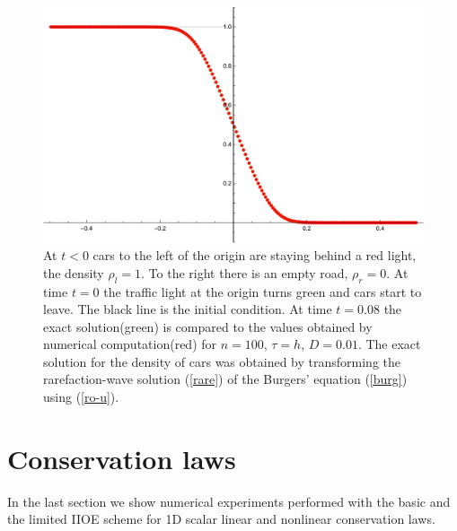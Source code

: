 \documentclass[../include.tex]{subfiles}
\begin{document}
\begin{figure}[h!]
	\centering
	\includegraphics[width=.5\textwidth]{figures/trafficRare1}
	\caption{At $ t<0 $ cars to the left of the origin are staying behind a red light, the density $ \rho_l = 1 $. To the right there is an empty road, $ \rho_r = 0 $. At time $ t = 0 $ the traffic light at the origin turns green and cars start to leave. The black line is the initial condition. At time $ t = 0.08 $ the exact solution(green) is compared to the values obtained by numerical computation(red) for $ n = 100 $, $ \tau = h $, $ D = 0.01 $. The exact solution for the density of cars was obtained by transforming the rarefaction-wave solution {\rm (\ref{rare})} of the Burgers' equation {\rm (\ref{burg})} using {\rm (\ref{ro-u})}.}
	\label{fig:traffic_rare}
\end{figure}
\section{Conservation laws}
In the last section we show numerical experiments performed with the basic and the limited IIOE scheme for 1D scalar linear and nonlinear conservation laws.
\end{document}
